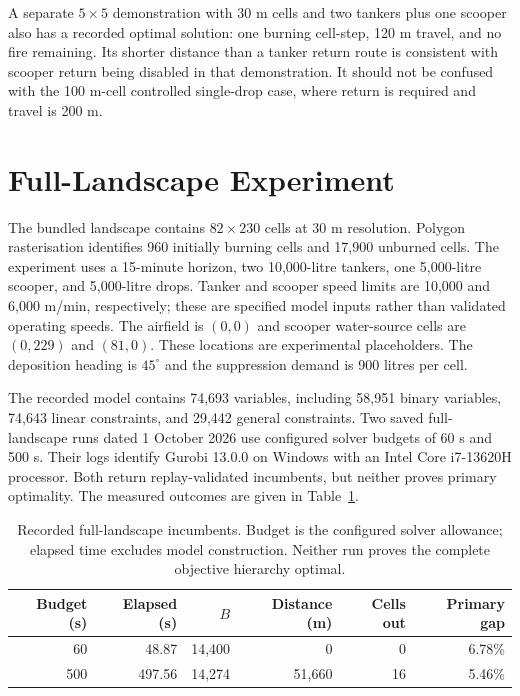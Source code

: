 A separate $5\times5$ demonstration with 30 m cells and two tankers plus one scooper also has a recorded optimal solution: one burning cell-step, 120 m travel, and no fire remaining. Its shorter distance than a tanker return route is consistent with scooper return being disabled in that demonstration. It should not be confused with the 100 m-cell controlled single-drop case, where return is required and travel is 200 m.

\section{Full-Landscape Experiment}
\label{sec:validation-landscape}

The bundled landscape contains $82\times230$ cells at 30 m resolution. Polygon rasterisation identifies 960 initially burning cells and 17,900 unburned cells. The experiment uses a 15-minute horizon, two 10,000-litre tankers, one 5,000-litre scooper, and 5,000-litre drops. Tanker and scooper speed limits are 10,000 and 6,000 m/min, respectively; these are specified model inputs rather than validated operating speeds. The airfield is $(0,0)$ and scooper water-source cells are $(0,229)$ and $(81,0)$. These locations are experimental placeholders. The deposition heading is $45^\circ$ and the suppression demand is 900 litres per cell.

The recorded model contains 74,693 variables, including 58,951 binary variables, 74,643 linear constraints, and 29,442 general constraints. Two saved full-landscape runs dated 1 October 2026 use configured solver budgets of 60 s and 500 s. Their logs identify Gurobi 13.0.0 on Windows with an Intel Core i7-13620H processor. Both return replay-validated incumbents, but neither proves primary optimality. The measured outcomes are given in Table~\ref{tab:landscape-results}.

\begin{table}[htbp]
\centering
\small
\caption{Recorded full-landscape incumbents. Budget is the configured solver allowance; elapsed time excludes model construction. Neither run proves the complete objective hierarchy optimal.}
\label{tab:landscape-results}
\begin{tabular}{rrrrrr}
\hline
Budget (s) & Elapsed (s) & $B$ & Distance (m) & Cells out & Primary gap \\
\hline
60 & 48.87 & 14,400 & 0 & 0 & 6.78\% \\
500 & 497.56 & 14,274 & 51,660 & 16 & 5.46\% \\
\hline
\end{tabular}
\end{table}

